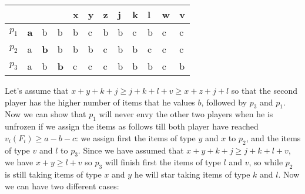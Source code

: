 \documentclass{article}
\begin{document}
\begin{table}[h]
\centering
\begin{tabular}{|l|l|l|l||l|l|l|l|l|l|l|l|}
\hline
      &                 &               &               & x & y & z & j & k & l & w & v \\ \hline
$p_1$ & \textbf{a}     & b             & b             & b & c & b & b & c & b & c & c \\ \hline
$p_2$ & a               & \textbf{b}    & b             & b & b & c & b & b & c & c & c \\ \hline
$p_3$ & a               & b             & \textbf{b}    & c & c & c & b & b & b & c & b \\ \hline
\end{tabular}
\end{table}
Let's assume that $x + y + k + j \ge j + k + l + v \ge x + z + j + l$ so that the second player has the higher number of items that he values $b$, followed by $p_3$ and $p_1$. Now we can show that $p_1$ will never envy the other two players when he is unfrozen if we assign the items as follows till both player have reached $v_i(F_i) \ge a-b-c$: we assign first the items of type $y$ and $x$ to $p_2$, and the items of type $v$ and $l$ to $p_3$. Since we have assumed that $x + y + k + j \ge j + k + l + v $, we have $x + y  \ge  l + v $ so $p_3$ will finish first the items of type $l$ and $v$, so while $p_2$ is still taking items of type $x$ and $y$ he will star taking items of type $k$ and $l$. Now we can have two different cases:
\end{document}

